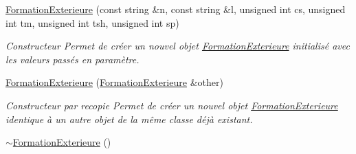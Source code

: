\begin{DoxyCompactItemize}
\item 
\hyperlink{class_formation_exterieure_aaf1f0e33b9e862ccc2b4390e0e2424cd}{Formation\-Exterieure} (const string \&n, const string \&l, unsigned int cs, unsigned int tm, unsigned int tsh, unsigned int sp)
\begin{DoxyCompactList}\small\item\em Constructeur Permet de créer un nouvel objet \hyperlink{class_formation_exterieure}{Formation\-Exterieure} initialisé avec les valeurs passés en paramètre. \end{DoxyCompactList}\item 
\hyperlink{class_formation_exterieure_a64dede0a85be1c33cc477c93cc2a6fcf}{Formation\-Exterieure} (\hyperlink{class_formation_exterieure}{Formation\-Exterieure} \&other)
\begin{DoxyCompactList}\small\item\em Constructeur par recopie Permet de créer un nouvel objet \hyperlink{class_formation_exterieure}{Formation\-Exterieure} identique à un autre objet de la même classe déjà existant. \end{DoxyCompactList}\item 
\hypertarget{class_formation_exterieure_a887fa1d6f08d8ea04b716a9564732586}{\hyperlink{class_formation_exterieure_a887fa1d6f08d8ea04b716a9564732586}{$\sim$\-Formation\-Exterieure} ()}\label{class_formation_exterieure_a887fa1d6f08d8ea04b716a9564732586}


\end{DoxyCompactItemize}
